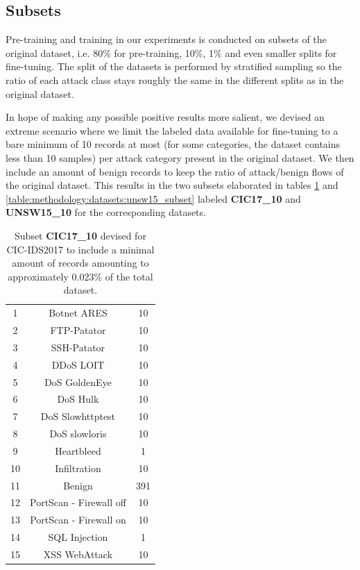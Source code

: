 \subsection{Subsets} \label{sec:methodology:subsets}

Pre-training and training in our experiments is conducted on subsets of the original dataset, i.e. 80\% for pre-training, 10\%, 1\% and even smaller splits for fine-tuning. The split of the datasets is performed by stratified sampling so the ratio of each attack class stays roughly the same in the different splits as in the original dataset. \par

In hope of making any possible positive results more salient, we devised an extreme scenario where we limit the labeled data available for fine-tuning to a bare minimum of 10 records at most (for some categories, the dataset contains less than 10 samples) per attack category present in the original dataset. We then include an amount of benign records to keep the ratio of attack/benign flows of the original dataset. This results in the two subsets elaborated in tables \ref{table:methodology:datasets:cic17_subset} and \ref{table:methodology:datasets:unsw15_subset} labeled \textbf{CIC17\_10} and \textbf{UNSW15\_10} for the corresponding datasets.

\begin{table}[H]
	\centering
	\begin{tabular}{ccc}
		\thead{\textbf{\#}} & \thead{\textbf{Class}} & \thead{\textbf{No. Records}} \\ \hline \midrule
		1  & Botnet ARES             & 10  \\
		2  & FTP-Patator             & 10  \\
		3  & SSH-Patator             & 10  \\
		4  & DDoS LOIT               & 10  \\
		5  & DoS GoldenEye           & 10  \\
		6  & DoS Hulk                & 10  \\
		7  & DoS Slowhttptest        & 10  \\
		8  & DoS slowloris           & 10  \\
		9  & Heartbleed              & 1  \\
		10  & Infiltration            & 10  \\
		11 & Benign                  & 391 \\
		12 & PortScan - Firewall off & 10  \\
		13 & PortScan - Firewall on  & 10  \\
		14 & SQL Injection           & 1   \\
		15 & XSS WebAttack           & 10                    
	\end{tabular}
	\caption{Subset \textbf{CIC17\_10} devised for CIC-IDS2017 to include a minimal amount of records amounting to approximately 0.023\% of the total dataset.}
	\label{table:methodology:datasets:cic17_subset}
\end{table}

